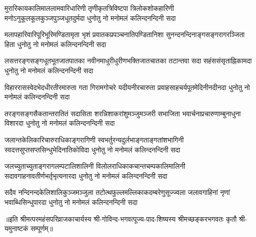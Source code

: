 
\fourlineindentedshloka
{मुरारिकायकालिमाललामवारिधारिणी}
{तृणीकृतत्रिविष्टपा त्रिलोकशोकहारिणी}
{मनोऽनुकूलकूलकुञ्जपुञ्जधूतदुर्मदा}
{धुनोतु नो मनोमलं कलिन्दनन्दिनी सदा}%

\fourlineindentedshloka
{मलापहारिवारिपूरिभूरिमण्डितामृता}
{भृशं प्रवातकप्रपञ्चनातिपण्डितानिशा}
{सुनन्दनन्दिनाङ्गसङ्गरागरञ्जिता हिता}
{धुनोतु नो मनोमलं कलिन्दनन्दिनी सदा}%

\fourlineindentedshloka
{लसत्तरङ्गसङ्गधूतभूतजातपातका}
{नवीनमाधुरीधुरीणभक्तिजातचातका}
{तटान्तवा  सदा  सहंससंसृताह्निकामदा} 
{धुनोतु नो मनोमलं कलिन्दनन्दिनी सदा}%

\fourlineindentedshloka
{विहाररासस्वेदभेदधीरतीरमारुता}
{गता गिरामगोचरे यदीयनीरचारुता}
{प्रवाहसाहचर्यपूतमेदिनीनदीनदा}
{धुनोतु नो मनोमलं कलिन्दनन्दिनी सदा}%

\fourlineindentedshloka
{तरङ्गसङ्गसैकतान्तरातितं सदासिता}
{शरन्निशाकरांशुमञ्जुमञ्जरी सभाजिता}
{भवार्चनाप्रचारुणाम्बुनाधुना विशारदा}
{धुनोतु नो मनोमलं कलिन्दनन्दिनी सदा}%

\fourlineindentedshloka
{जलान्तकेलिकारिचारुराधिकाङ्गरागिणी}
{स्वभर्तुरन्यदुर्लभाङ्गताङ्गतांशभागिनी}
{स्वदत्तसुप्तसप्तसिन्धुभेदिनातिकोविदा}
{धुनोतु नो मनोमलं कलिन्दनन्दिनी सदा}%

\fourlineindentedshloka
{जलच्युताच्युताङ्गरागलम्पटालिशालिनी}
{विलोलराधिकाकचान्तचम्पकालिमालिनी}
{सदावगाहनावतीर्णभर्तृभृत्यनारदा}
{धुनोतु नो मनोमलं कलिन्दनन्दिनी सदा}%

\fourlineindentedshloka
{सदैव नन्दिनन्दकेलिशालिकुञ्जमञ्जुला}
{तटोत्थफुल्लमल्लिकाकदम्बरेणुसूज्ज्वला}
{जलावगाहिनां नृणां भवाब्धिसिन्धुपारदा}
{धुनोतु नो मनोमलं कलिन्दनन्दिनी सदा}%

॥इति श्रीमत्परमहंसपरिव्राजकाचार्यस्य श्री-गोविन्द-भगवत्पूज्य-पाद-शिष्यस्य 
श्रीमच्छङ्करभगवतः कृतौ श्री-यमुनाष्टकं सम्पूर्णम्॥
